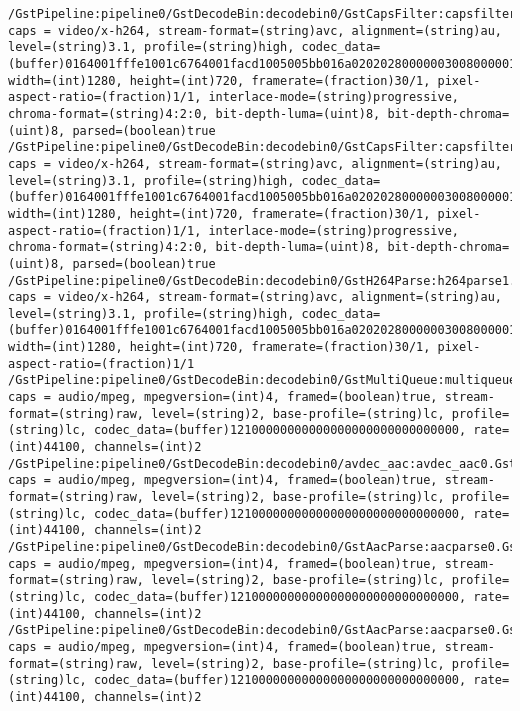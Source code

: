 \documentclass[12pt,oneside]{book}
\begin{document}
\begin{lstlisting}
/GstPipeline:pipeline0/GstDecodeBin:decodebin0/GstCapsFilter:capsfilter2.GstPad:src: caps = video/x-h264, stream-format=(string)avc, alignment=(string)au, level=(string)3.1, profile=(string)high, codec_data=(buffer)0164001fffe1001c6764001facd1005005bb016a02020280000003008000001e078c188901000468eb8f2c, width=(int)1280, height=(int)720, framerate=(fraction)30/1, pixel-aspect-ratio=(fraction)1/1, interlace-mode=(string)progressive, chroma-format=(string)4:2:0, bit-depth-luma=(uint)8, bit-depth-chroma=(uint)8, parsed=(boolean)true
/GstPipeline:pipeline0/GstDecodeBin:decodebin0/GstCapsFilter:capsfilter2.GstPad:sink: caps = video/x-h264, stream-format=(string)avc, alignment=(string)au, level=(string)3.1, profile=(string)high, codec_data=(buffer)0164001fffe1001c6764001facd1005005bb016a02020280000003008000001e078c188901000468eb8f2c, width=(int)1280, height=(int)720, framerate=(fraction)30/1, pixel-aspect-ratio=(fraction)1/1, interlace-mode=(string)progressive, chroma-format=(string)4:2:0, bit-depth-luma=(uint)8, bit-depth-chroma=(uint)8, parsed=(boolean)true
/GstPipeline:pipeline0/GstDecodeBin:decodebin0/GstH264Parse:h264parse1.GstPad:sink: caps = video/x-h264, stream-format=(string)avc, alignment=(string)au, level=(string)3.1, profile=(string)high, codec_data=(buffer)0164001fffe1001c6764001facd1005005bb016a02020280000003008000001e078c188901000468eb8f2c, width=(int)1280, height=(int)720, framerate=(fraction)30/1, pixel-aspect-ratio=(fraction)1/1
/GstPipeline:pipeline0/GstDecodeBin:decodebin0/GstMultiQueue:multiqueue0.GstPad:src_1: caps = audio/mpeg, mpegversion=(int)4, framed=(boolean)true, stream-format=(string)raw, level=(string)2, base-profile=(string)lc, profile=(string)lc, codec_data=(buffer)12100000000000000000000000000000, rate=(int)44100, channels=(int)2
/GstPipeline:pipeline0/GstDecodeBin:decodebin0/avdec_aac:avdec_aac0.GstPad:sink: caps = audio/mpeg, mpegversion=(int)4, framed=(boolean)true, stream-format=(string)raw, level=(string)2, base-profile=(string)lc, profile=(string)lc, codec_data=(buffer)12100000000000000000000000000000, rate=(int)44100, channels=(int)2
/GstPipeline:pipeline0/GstDecodeBin:decodebin0/GstAacParse:aacparse0.GstPad:src: caps = audio/mpeg, mpegversion=(int)4, framed=(boolean)true, stream-format=(string)raw, level=(string)2, base-profile=(string)lc, profile=(string)lc, codec_data=(buffer)12100000000000000000000000000000, rate=(int)44100, channels=(int)2
/GstPipeline:pipeline0/GstDecodeBin:decodebin0/GstAacParse:aacparse0.GstPad:sink: caps = audio/mpeg, mpegversion=(int)4, framed=(boolean)true, stream-format=(string)raw, level=(string)2, base-profile=(string)lc, profile=(string)lc, codec_data=(buffer)12100000000000000000000000000000, rate=(int)44100, channels=(int)2

\end{lstlisting}
\end{document}

